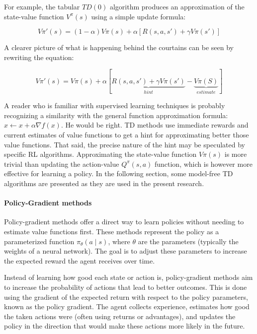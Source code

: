 For example, the tabular $TD(0)$ algorithm produces an approximation of the state-value function $V^\pi(s)$ using a simple update formula:

\begin{equation} \label{eq:TD0-update}
  V\pi'(s) = (1 - \alpha) V\pi(s) + \alpha \left[ R(s, a, s') + \gamma V\pi(s') \right]
\end{equation}

A clearer picture of what is happening behind the courtains can be seen by rewriting the equation:

\begin{equation} \label{eq:TD0-update-rewritten}
  V\pi'(s) = V\pi(s) + \alpha \left[ \underbrace{R(s, a, s') + \gamma V\pi(s')}_{hint} - \underbrace{V\pi(S)}_{estimate} \right]
\end{equation}

A reader who is familiar with supervised learning techniques is probably recognizing a similarity with the general function approximation formula: $x \leftarrow x + \alpha \nabla f(x)$.
He would be right. TD methods use immediate rewards and current estimates of value functions to get a hint for approximating better those value functions.
That said, the precise nature of the hint may be speculated by specific RL algorithms. Approximating the state-value function $V\pi(s)$ is more trivial than updating the action-value $Q^\pi(s, a)$ function, which is however more effective for learning a policy. In the following section, some model-free TD algorithms are presented as they are used in the present research.

\paragraph{Policy-Gradient methods}

Policy-gradient methods offer a direct way to learn policies without needing to estimate value functions first. These methods represent the policy as a parameterized function $\pi_\theta(a \mid s)$, where $\theta$ are the parameters (typically the weights of a neural network). The goal is to adjust these parameters to increase the expected reward the agent receives over time.

Instead of learning how good each state or action is, policy-gradient methods aim to increase the probability of actions that lead to better outcomes. This is done using the gradient of the expected return with respect to the policy parameters, known as the policy gradient. The agent collects experience, estimates how good the taken actions were (often using returns or advantages), and updates the policy in the direction that would make these actions more likely in the future.

